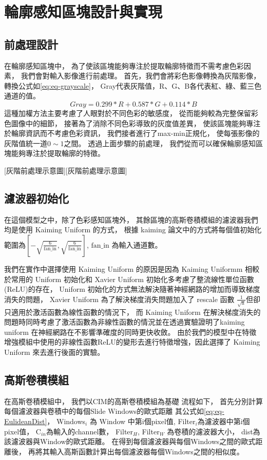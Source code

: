 \documentclass[class=NCU_thesis, crop=false]{standalone}
\begin{document}
\pagebreak
\section{輪廓感知區塊設計與實現}
	\subsection{前處理設計}
	在輪廓感知區塊中，
	為了使該區塊能夠專注於提取輪廓特徵而不需考慮色彩因素，
	我們會對輸入影像進行前處理。
	首先，我們會將彩色影像轉換為灰階影像，
	轉換公式如\cref{eq:eq-grayscale}，
	Gray代表灰階值，R、G、B各代表紅、綠、藍三色通道的值。
	\begin{equation}
	    \label{eq:eq-grayscale}
	    Gray = 0.299 * R + 0.587 * G + 0.114 * B
	\end{equation}
	這種加權方法主要考慮了人眼對於不同色彩的敏感度，
	從而能夠較為完整保留彩色圖像中的細節，
	接著為了消除不同色彩導致的灰度值差異，
	使該區塊能夠專注於輪廓資訊而不考慮色彩資訊，
	我們接者進行了max-min正規化，
	使每張影像的灰階值統一道$0\sim1$之間。
	透過上面步驟的前處理，
	我們從而可以確保輪廓感知區塊能夠專注於提取輪廓的特徵。

	[灰階前處理示意圖][灰階前處理示意圖]

	\subsection{濾波器初始化}
	在這個模型之中，除了色彩感知區塊外，
	其餘區塊的高斯卷積模組的濾波器我們均是使用 Kaiming Uniform 的方式，
	根據 kaiming 論文\cite{DBLP:journals/corr/HeZR015}中的方式將每個值初始化範圍為$[-\sqrt{\frac{6}{\text{fan\_in}}}, \sqrt{\frac{6}{\text{fan\_in}}}]$,
	$\text{fan\_in}$ 為輸入通道數。

	我們在實作中選擇使用 Kaiming Uniform 的原因是因為 Kaiming Uniformm 相較於常用的 Uniform 初始化和 Xavier Uniform\cite{pmlr-v9-glorot10a} 初始化多考慮了整流線性單位函數(ReLU)的存在，
	Uniform 初始化的方式無法解決隨著神經網路的增加而導致梯度消失的問題，
	Xavier Uniform 為了解決梯度消失問題加入了 rescale 函數 $\frac{1}{\sqrt{\text{n}}}$但卻只適用於激活函數為線性函數的情況下，
	而 Kaiming Uniform 在解決梯度消失的問題時同時考慮了激活函數為非線性函數的情況並在\cite{DBLP:journals/corr/HeZR015}透過實驗證明了kaiming uniform 在神經網路在不影響準確度的同時更快收斂。
	由於我們的模型中在特徵增強模組中使用的非線性函數ReLU的變形去進行特徵增強，因此選擇了 Kaiming Uniform 來去進行後面的實驗。

	\subsection{高斯卷積模組}
	在高斯卷積模組中，
	我們以CIM的高斯卷積模組為基礎
	流程如下，
	首先分別計算每個濾波器與卷積中的每個Slide Windows的歐式距離
	其公式如\cref{eq:eq-EulideanDist}，
	Windows$_{i}$ 為 Window 中第i個pixel值, 
	Filter$_{i}$為濾波器中第i個pixel值，
	C$_{in}$為輸入的channel數，
	Filter$_{H}$, Filter$_{W}$ 為卷積的濾波器大小，
	dist為該濾波器與Window的歐式距離。
	在得到每個濾波器與每個Windows之間的歐式距離後，
	再將其輸入高斯函數計算出每個濾波器每個Windows之間的相似度。
\end{document}
